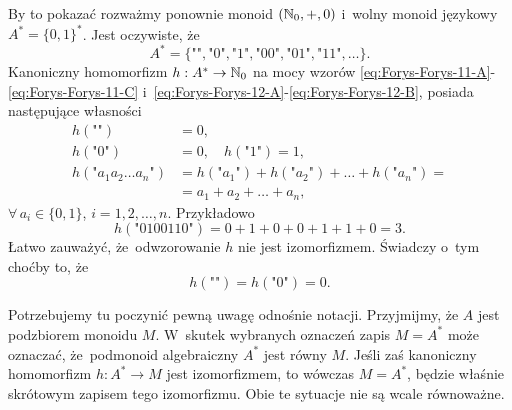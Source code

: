 \documentclass[a4paper,11pt]{article}
\begin{document}
By to pokazać rozważmy
ponownie monoid $( \mathbb{N}_{ 0 }, +, 0 )$ i~wolny monoid językowy
$A^{ * } = \{ 0, 1 \}^{ * }$. Jest
oczywiste, że
\begin{equation}
  \label{eq:Forys-Forys-13}
  A^{ * } =
  \{ \texttt{""}, \texttt{"} 0 \texttt{"}, \texttt{"} 1 \texttt{"},
  \texttt{"} 0 0 \texttt{"}, \texttt{"} 0 1 \texttt{"},
  \texttt{"} 1 1 \texttt{"}, \ldots \}.
\end{equation}
Kanoniczny homomorfizm $h : A^{ * } \to \mathbb{N}_{ 0 }$ na mocy wzorów
\eqref{eq:Forys-Forys-11-A}-\eqref{eq:Forys-Forys-11-C}
i~\eqref{eq:Forys-Forys-12-A}-\eqref{eq:Forys-Forys-12-B}, posiada
następujące własności
\begin{subequations}
  \begin{align}
    \label{eq:Forys-Forys-14-A}
    h( \texttt{""} ) &= 0, \\
    \label{eq:Forys-Forys-14-B}
    h( \texttt{"} 0 \texttt{"} ) &= 0, \quad
    h( \texttt{"} 1 \texttt{"} ) = 1, \\
    \label{eq:Forys-Forys-14-C}
    h( \texttt{"} a_{ 1 } a_{ 2 } \ldots a_{ n } \texttt{"} )
                     &= h( \texttt{"} a_{ 1 } \texttt{"} )
                       + h( \texttt{"} a_{ 2 } \texttt{"} ) + \ldots
                       + h( \texttt{"} a_{ n } \texttt{"} ) = \\
                     &= a_{ 1 } + a_{ 2 } + \ldots + a_{ n },
  \end{align}
\end{subequations}
$\forall \, a_{ i } \in \{ 0, 1 \}$, $i = 1, 2, \ldots, n$. Przykładowo
\begin{equation}
  \label{eq:Forys-Forys-15}
  h( \texttt{"} 0100110 \texttt{"} ) =
  0 + 1 + 0 + 0 + 1 + 1 + 0 = 3.
\end{equation}
Łatwo zauważyć, że~odwzorowanie $h$ nie jest izomorfizmem. Świadczy o~tym
choćby to, że
\begin{equation}
  \label{eq:Forys-Forys-16}
  h( \texttt{""} ) = h( \texttt{"} 0 \texttt{"} ) = 0.
\end{equation}

\vspace{\spaceFour}





\start {} Potrzebujemy tu poczynić pewną uwagę odnośnie notacji.
Przyjmijmy, że $A$ jest podzbiorem monoidu $M$. W~skutek wybranych oznaczeń
zapis $M = A^{ * }$ może oznaczać, że~podmonoid algebraiczny $A^{ * }$ jest
równy $M$. Jeśli zaś kanoniczny homomorfizm $h : A^{ * } \to M$ jest
izomorfizmem, to wówczas $M = A^{ * }$, będzie właśnie skrótowym zapisem tego
izomorfizmu. Obie te sytuacje nie są wcale równoważne.
\end{document}
